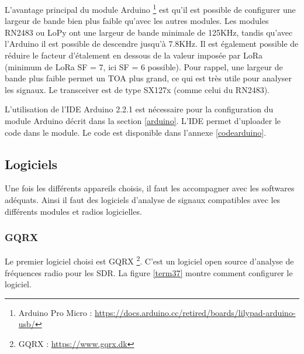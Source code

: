 L'avantage principal du module Arduino \footnote{Arduino Pro Micro : \href{https://docs.arduino.cc/retired/boards/lilypad-arduino-usb/}{https://docs.arduino.cc/retired/boards/lilypad-arduino-usb/}} est qu'il est possible de configurer une largeur de bande bien plus faible qu'avec les autres modules. Les modules RN2483 ou LoPy ont une largeur de bande minimale de 125KHz, tandis qu'avec l'Arduino il est possible de descendre jusqu'à 7.8KHz. Il est également possible de réduire le facteur d'étalement en dessous de la valeur imposée par LoRa (minimum de LoRa SF = 7, ici SF = 6 possible). Pour rappel, une largeur de bande plus faible permet un \ac{TOA} plus grand, ce qui est très utile pour analyser les signaux. Le transceiver est de type SX127x (comme celui du RN2483).

\vspace{0.1cm}

L'utilisation de l'\ac{IDE} Arduino 2.2.1 est nécessaire pour la configuration du module Arduino décrit dans la section \ref{arduino}. L'\ac{IDE} permet d'uploader le code  dans le module. Le code est disponible dans l'annexe \ref{codearduino}.

\subsection{Logiciels}\label{fft}

Une fois les différents appareils choisis, il faut les accompagner avec les softwares adéquats. Ainsi il faut des logiciels d'analyse de signaux compatibles avec les différents modules et radios logicielles.

\subsubsection{GQRX}

Le premier logiciel choisi est GQRX \footnote{GQRX : \href{https://www.gqrx.dk}{https://www.gqrx.dk}}. C'est un logiciel open source d'analyse de fréquences radio pour les \ac{SDR}. La figure \ref{term37} montre comment configurer le logiciel.

